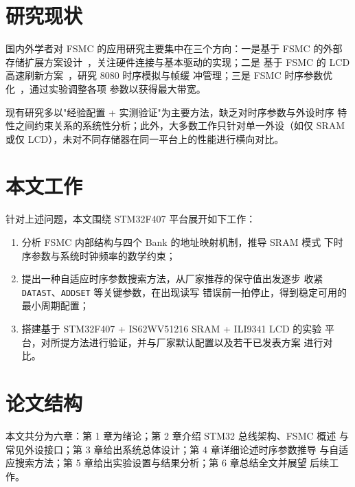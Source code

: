 \section{研究现状}
\label{sec:related}

国内外学者对 FSMC 的应用研究主要集中在三个方向：一是基于 FSMC 的外部
存储扩展方案设计~\cite{wang2019sram}，关注硬件连接与基本驱动的实现；二是
基于 FSMC 的 LCD 高速刷新方案~\cite{li2020lcd}，研究 8080 时序模拟与帧缓
冲管理；三是 FSMC 时序参数优化~\cite{zhang2021timing}，通过实验调整各项
参数以获得最大带宽。

现有研究多以"经验配置 + 实测验证"为主要方法，缺乏对时序参数与外设时序
特性之间约束关系的系统性分析；此外，大多数工作只针对单一外设（如仅 SRAM
或仅 LCD），未对不同存储器在同一平台上的性能进行横向对比。

\section{本文工作}
\label{sec:contributions}

针对上述问题，本文围绕 STM32F407 平台展开如下工作：

\begin{enumerate}
    \item 分析 FSMC 内部结构与四个 Bank 的地址映射机制，推导 SRAM 模式
          下时序参数与系统时钟频率的数学约束；
    \item 提出一种自适应时序参数搜索方法，从厂家推荐的保守值出发逐步
          收紧 \texttt{DATAST}、\texttt{ADDSET} 等关键参数，在出现读写
          错误前一拍停止，得到稳定可用的最小周期配置；
    \item 搭建基于 STM32F407 + IS62WV51216 SRAM + ILI9341 LCD 的实验
          平台，对所提方法进行验证，并与厂家默认配置以及若干已发表方案
          进行对比。
\end{enumerate}

\section{论文结构}
\label{sec:structure}

本文共分为六章：第 1 章为绪论；第 2 章介绍 STM32 总线架构、FSMC 概述
与常见外设接口；第 3 章给出系统总体设计；第 4 章详细论述时序参数推导
与自适应搜索方法；第 5 章给出实验设置与结果分析；第 6 章总结全文并展望
后续工作。
